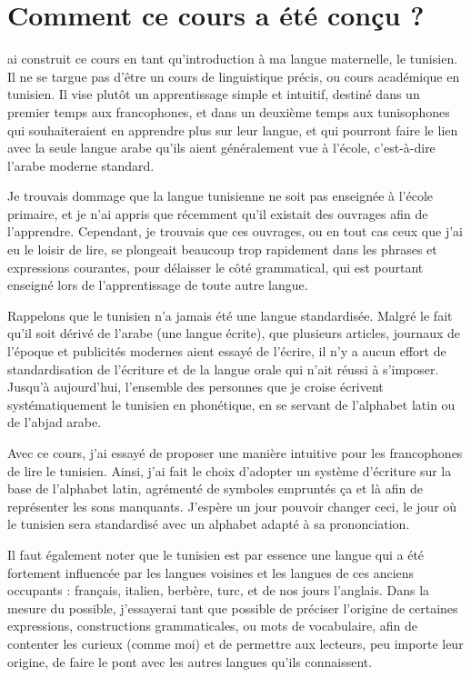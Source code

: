 \chapter*{Comment ce cours a été conçu ?}
ai construit ce cours en tant qu'introduction à ma langue maternelle, le tunisien. Il ne se targue pas d'être un cours de linguistique précis, ou cours académique en tunisien. Il vise plutôt un apprentissage simple et intuitif, destiné dans un premier temps aux francophones, et dans un deuxième temps aux tunisophones qui souhaiteraient en apprendre plus sur leur langue, et qui pourront faire le lien avec la seule langue arabe qu'ils aient généralement vue à l'école, c'est-à-dire l'arabe moderne standard. 

Je trouvais dommage que la langue tunisienne ne soit pas enseignée à l'école primaire, et je n'ai appris que récemment qu'il existait des ouvrages afin de l'apprendre. Cependant, je trouvais que ces ouvrages, ou en tout cas ceux que j'ai eu le loisir de lire, se plongeait beaucoup trop rapidement dans les phrases et expressions courantes, pour délaisser le côté grammatical, qui est pourtant enseigné lors de l'apprentissage de toute autre langue.

Rappelons que le tunisien n'a jamais été une langue standardisée. Malgré le fait qu'il soit dérivé de l'arabe (une langue écrite), que plusieurs articles, journaux de l'époque et publicités modernes aient essayé de l'écrire, il n'y a aucun effort de standardisation de l'écriture et de la langue orale qui n'ait réussi à s'imposer. Jusqu'à aujourd'hui, l'ensemble des personnes que je croise écrivent systématiquement le tunisien en phonétique, en se servant de l'alphabet latin ou de l'abjad arabe.

Avec ce cours, j'ai essayé de proposer une manière intuitive pour les francophones de lire le tunisien. Ainsi, j'ai fait le choix d'adopter un système d'écriture sur la base de l'alphabet latin, agrémenté de symboles empruntés ça et là afin de représenter les sons manquants. J'espère un jour pouvoir changer ceci, le jour où le tunisien sera standardisé avec un alphabet adapté à sa prononciation. 

Il faut également noter que le tunisien est par essence une langue qui a été fortement influencée par les langues voisines et les langues de ces anciens occupants : français, italien, berbère, turc, et de nos jours l'anglais. Dans la mesure du possible, j'essayerai tant que possible de préciser l'origine de certaines expressions, constructions grammaticales, ou mots de vocabulaire, afin de contenter les curieux (comme moi) et de permettre aux lecteurs, peu importe leur origine, de faire le pont avec les autres langues qu'ils connaissent.